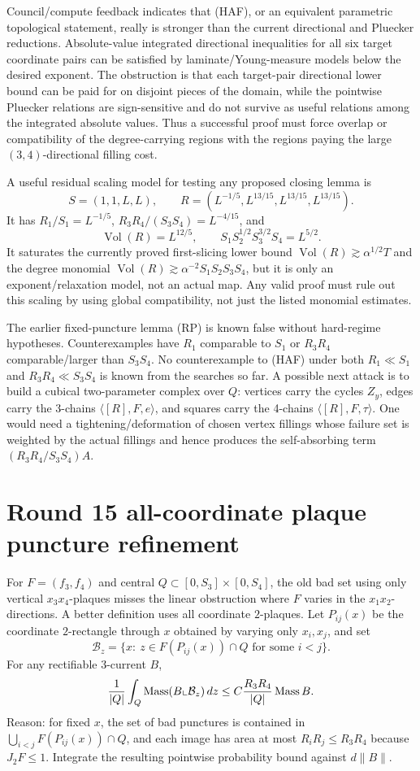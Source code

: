 \documentclass[12pt]{article}
\newcommand{\Vol}{\operatorname{Vol}}
\newcommand{\Mass}{\operatorname{Mass}}
\begin{document}
Council/compute feedback indicates that (HAF), or an equivalent parametric
topological statement, really is stronger than the current directional and
Pluecker reductions.  Absolute-value integrated directional inequalities for all
six target coordinate pairs can be satisfied by laminate/Young-measure models
below the desired exponent.  The obstruction is that each target-pair directional
lower bound can be paid for on disjoint pieces of the domain, while the pointwise
Pluecker relations are sign-sensitive and do not survive as useful relations among
the integrated absolute values.  Thus a successful proof must force overlap or
compatibility of the degree-carrying regions with the regions paying the large
\((3,4)\)-directional filling cost.

A useful residual scaling model for testing any proposed closing lemma is
\[
 S=(1,1,L,L),\qquad
 R=(L^{-1/5},L^{13/15},L^{13/15},L^{13/15}).
\]
It has \(R_1/S_1=L^{-1/5}\), \(R_3R_4/(S_3S_4)=L^{-4/15}\), and
\[
 \Vol(R)=L^{12/5},\qquad
 S_1S_2^{1/2}S_3^{3/2}S_4=L^{5/2}.
\]
It saturates the currently proved first-slicing lower bound
\(\Vol(R)\gtrsim \alpha^{1/2}T\) and the degree monomial
\(\Vol(R)\gtrsim \alpha^{-2}S_1S_2S_3S_4\), but it is only an exponent/relaxation
model, not an actual map.  Any valid proof must rule out this scaling by using
global compatibility, not just the listed monomial estimates.

The earlier fixed-puncture lemma (RP) is known false without hard-regime
hypotheses.  Counterexamples have \(R_1\) comparable to \(S_1\) or
\(R_3R_4\) comparable/larger than \(S_3S_4\).  No counterexample to (HAF) under
both \(R_1\ll S_1\) and \(R_3R_4\ll S_3S_4\) is known from the searches so far.
A possible next attack is to build a cubical two-parameter complex over \(Q\):
vertices carry the cycles \(Z_y\), edges carry the 3-chains
\(\langle[R],F,e\rangle\), and squares carry the 4-chains
\(\langle[R],F,\tau\rangle\).  One would need a tightening/deformation of chosen
vertex fillings whose failure set is weighted by the actual fillings and hence
produces the self-absorbing term \((R_3R_4/S_3S_4)A\).




\section*{Round 15 all-coordinate plaque puncture refinement}

For \(F=(f_3,f_4)\) and central \(Q\subset [0,S_3]\times[0,S_4]\), the old bad set
using only vertical \(x_3x_4\)-plaques misses the linear obstruction where \(F\)
varies in the \(x_1x_2\)-directions.  A better definition uses all coordinate
\(2\)-plaques.  Let \(P_{ij}(x)\) be the coordinate \(2\)-rectangle through \(x\)
obtained by varying only \(x_i,x_j\), and set
\[
 \mathcal B_z=\{x:\ z\in F(P_{ij}(x))\cap Q\text{ for some }i<j\}.
\]
For any rectifiable \(3\)-current \(B\),
\[
 {1\over |Q|}\int_Q \Mass(B\llcorner\mathcal B_z)\,dz
 \le C {R_3R_4\over |Q|}\Mass B.
\]
Reason: for fixed \(x\), the set of bad punctures is contained in
\(\bigcup_{i<j} F(P_{ij}(x))\cap Q\), and each image has area at most
\(R_iR_j\le R_3R_4\) because \(J_2F\le1\).  Integrate the resulting pointwise
probability bound against \(d\|B\|\).
\end{document}
